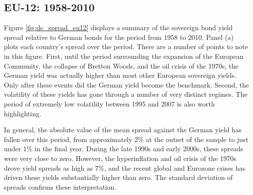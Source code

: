 \documentclass[3p]{elsarticle}
\begin{document}
\subsection{EU-12: 1958-2010}
Figure \ref{fig:de_spread_eu12} displays a summary of the sovereign bond yield spread relative to German bonds for the period from 1958 to 2010.  Panel (a) plots each country's spread over the period.  There are a number of points to note in this figure.  First, until the period surrounding the expansion of the European Community, the collapse of Bretton Woods, and the oil crisis of the 1970s, the German yield was actually higher than most other European sovereign yields.  Only after these events did the German yield become the benchmark.  Second, the volatility of these yields has gone through a number of very distinct regimes.  The period of extremely low volatility between 1995 and 2007 is also worth highlighting.  

In general, the absolute value of the mean spread against the German yield has fallen over this period, from approximately 2\% at the outset of the sample to just under 1\% in the final year.  During the late 1990s and early 2000s, these spreads were very close to zero.  However, the hyperinflation and oil crisis of the 1970s drove yield spreads as high as 7\%, and the recent global and Eurozone crises has driven these yields substantially higher than zero.  The standard deviation of spreads confirms these interpretation.
\end{document}
